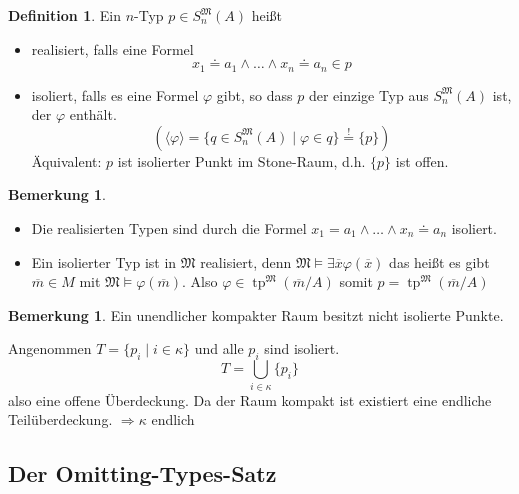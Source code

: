 \documentclass[12pt,parskip=full]{scrartcl}
\theoremstyle{definition}
\newtheorem{definition}[theorem]{Definition}
\newtheorem{remark}[theorem]{Bemerkung}
\begin{document}
 	\begin{definition}
 		Ein $n$-Typ $p \in S_n^\mathfrak{M}(A)$ heißt
 		\begin{itemize}
 			\item realisiert, falls eine Formel
 			\begin{equation*}
	 			x_1 \doteq a_1 \land \dots \land x_n \doteq a_n \in p
 			\end{equation*}
 			\item isoliert, falls es eine Formel $\varphi$ gibt, so dass $p$ der einzige Typ aus $S_n^\mathfrak{M}(A)$ ist, der $\varphi$ enthält.
 			\begin{equation*}
	 			\left( \langle \varphi \rangle = \{ q \in S_n^\mathfrak{M}(A) \mid \varphi \in q \} \overset{!}{=} \{ p \} \right)
 			\end{equation*}
 			Äquivalent: $p$ ist isolierter Punkt im Stone-Raum, d.h. $\{ p \}$ ist offen.
 		\end{itemize}
 	\end{definition}
 
 	\begin{remark}
 		\begin{itemize}
 			\item Die realisierten Typen sind durch die Formel $x_1 = a_1 \land \dots \land x_n \doteq a_n$ isoliert.
 			\item Ein isolierter Typ ist in $\mathfrak{M}$ realisiert, denn $\mathfrak{M} \models \exists \overline{x} \varphi(\overline{x})$ das heißt es gibt $\overline{m} \in M$ mit $\mathfrak{M} \models \varphi(\overline{m})$. Also $\varphi \in \operatorname{tp}^\mathfrak{M}(\overline{m} / A)$ somit $p = \operatorname{tp}^\mathfrak{M}(\overline{m} / A)$
 		\end{itemize}
 	\end{remark}
 
 	\begin{remark}
 		Ein unendlicher kompakter Raum besitzt nicht isolierte Punkte.
 		
 		Angenommen $T = \{ p_i \mid i \in \kappa \}$ und alle $p_i$ sind isoliert.
 		\begin{equation*}
	 		T = \bigcup_{i \in \kappa} \{ p_i \}
 		\end{equation*}
 		also eine offene Überdeckung. Da der Raum kompakt ist existiert eine endliche Teilüberdeckung. $\Rightarrow \kappa$ endlich
 	\end{remark}
	
	\subsection{Der Omitting-Types-Satz}
	
\end{document}

